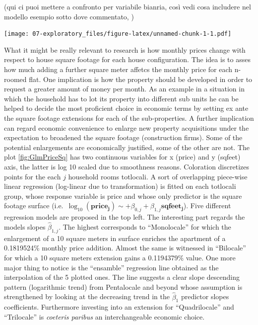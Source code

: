 \documentclass[
  12pt,
  a4paper,
  oneside]{book}
\theoremstyle{definition}
\theoremstyle{definition}
\theoremstyle{definition}
\theoremstyle{remark}
\begin{document}
(qui ci puoi mettere a confronto per variabile bianria, così vedi cosa includere nel modello esempio sotto dove commentato, )

\texttt{[image: 07-exploratory\_files/figure-latex/unnamed-chunk-1-1.pdf]}

What it might be really relevant to research is how monthly prices change with respect to house square footage for each house configuration. The idea is to asses how much adding a further square meter affetcs the monthly price for each n-roomed flat.
One implication is how the property should be developed in order to request a greater amount of money per month. As an example in a situation in which the household has to lot its property into different sub units he can be helped to decide the most proficient choice in economic terms by setting ex ante the square footage extensions for each of the sub-properties.
A further implication can regard economic convenience to enlarge new property acquisitions under the expectation to broadened the square footage (construction firms). Some of the potential enlargements are economically justified, some of the other are not.
The plot \ref{fig:GlmPriceSq} has two continuous variables for x (price) and y (sqfeet) axis, the latter is log 10 scaled due to smoothness reasons. Coloration discretizes points for the each \(j\) household rooms totlocali. A sort of overlapping piece-wise linear regression (log-linear due to transformation) is fitted on each totlocali group, whose response variable is price and whose only predictor is the square footage surface (i.e.~\(\log_{10}(\mathbf{price_j}) \sim +\beta_{0,j}+\beta_{1,j}\mathbf{sqfeet_j}\)). Five different regression models are proposed in the top left. The interesting part regards the models slopes \(\hat\beta_{1,j}\). The highest corresponds to ``Monolocale'' for which the enlargement of a 10 square meters in surface enriches the apartment of a 0.1819524\% monthly price addition. Almost the same is witnessed in ``Bilocale'' for which a 10 square meters extension gains a 0.1194379\% value. One more major thing to notice is the ``ensamble'' regression line obtained as the interpolation of the 5 plotted ones. The line suggests a clear slope descending pattern (logarithmic trend) from Pentalocale and beyond whose assumption is strengthened by looking at the decreasing trend in the \(\hat\beta_1\) predictor slopes coefficients. Furthermore investing into an extension for ``Quadrilocale'' and ``Trilocale'' is \emph{coeteris paribus} an interchangeable economic choice.
\end{document}
